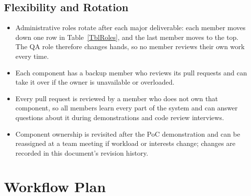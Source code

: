 \documentclass{article}
\begin{document}
\subsection{Flexibility and Rotation}
\begin{itemize}
    \item Administrative roles rotate after each major deliverable: each member
    moves down one row in Table~\ref{TblRoles}, and the last member moves to the
    top. The QA role therefore changes hands, so no member reviews their own
    work every time.
    \item Each component has a backup member who reviews its pull requests and
    can take it over if the owner is unavailable or overloaded.
    \item Every pull request is reviewed by a member who does not own that
    component, so all members learn every part of the system and can answer
    questions about it during demonstrations and code review interviews.
    \item Component ownership is revisited after the PoC demonstration and can
    be reassigned at a team meeting if workload or interests change; changes
    are recorded in this document's revision history.
\end{itemize}

\section{Workflow Plan}
\end{document}
